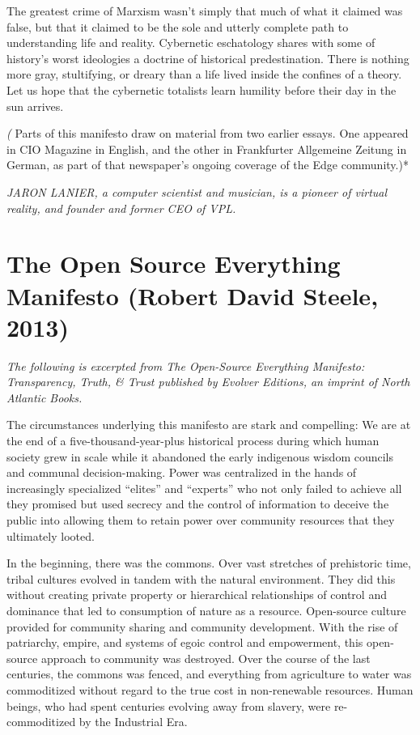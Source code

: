 \documentclass[letterpaper,12pt,english]{sphinxmanual}
\begin{document}
The greatest crime of Marxism wasn't simply that much of what it claimed was false, but that it claimed to be the sole and utterly complete path to understanding life and reality. Cybernetic eschatology shares with some of history's worst ideologies a doctrine of historical predestination. There is nothing more gray, stultifying, or dreary than a life lived inside the confines of a theory. Let us hope that the cybernetic totalists learn humility before their day in the sun arrives.

\emph{(} Parts of this manifesto draw on material from two earlier essays. One appeared in CIO Magazine in English, and the other in Frankfurter Allgemeine Zeitung in German, as part of that newspaper's ongoing coverage of the Edge community.)*

\emph{JARON LANIER, a computer scientist and musician, is a pioneer of virtual reality, and founder and former CEO of VPL.}


\chapter{The Open Source Everything Manifesto (Robert David Steele, 2013)}
\label{2013::doc}\label{2013:the-open-source-everything-manifesto-robert-david-steele-2013}
\emph{The following is excerpted from The Open-Source Everything Manifesto:
Transparency, Truth, \& Trust published by Evolver Editions, an imprint of North Atlantic Books.}

The circumstances underlying this manifesto are stark and compelling: We are at the end of a five-thousand-year-plus historical process during which human society grew in scale while it abandoned the early indigenous wisdom councils and communal decision-making. Power was centralized in the hands of increasingly specialized ``elites'' and ``experts'' who not only failed to achieve all they promised but used secrecy and the control of information to deceive the public into allowing them to retain power over community resources that they ultimately looted.

In the beginning, there was the commons. Over vast stretches of prehistoric time, tribal cultures evolved in tandem with the natural environment. They did this without creating private property or hierarchical relationships of control and dominance that led to consumption of nature as a resource. Open-source culture provided for community sharing and community development. With the rise of patriarchy, empire, and systems of egoic control and empowerment, this open-source approach to community was destroyed. Over the course of the last centuries, the commons was fenced, and everything from agriculture to water was commoditized without regard to the true cost in non-renewable resources. Human beings, who had spent centuries evolving away from slavery, were re-commoditized by the Industrial Era.
\end{document}
